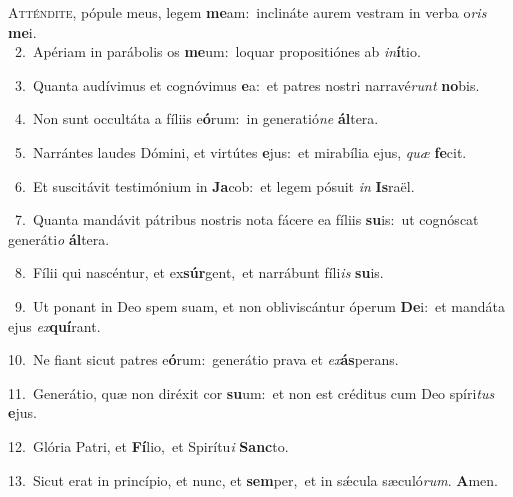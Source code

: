 \lettrine{\initial\textcolor{\initialcolor}{A}}{tténdite,} pópule meus, legem \textbf{me}\-am:~\star inclináte aurem vestram in verba o\textit{ris} \textbf{me}\-i.\\
{\numbfont\textcolor{\numbcolor}{~2.}}~Apériam in parábolis os \textbf{me}\-um:~\star loquar propositiónes ab \textit{in}\-\textbf{í}tio.\par
{\numbfont\textcolor{\numbcolor}{~3.}}~Quanta audívimus et cognóvimus \textbf{e}\-a:~\star et patres nostri narravé\textit{runt} \textbf{no}\-bis.\par
{\numbfont\textcolor{\numbcolor}{~4.}}~Non sunt occultáta a fíliis e\-\textbf{ó}\-rum:~\star in generatió\textit{ne} \textbf{ál}\-tera.\par
{\numbfont\textcolor{\numbcolor}{~5.}}~Narrántes laudes Dómini, et virtútes \textbf{e}\-jus:~\star et mirabília ejus, \textit{quæ} \textbf{fe}\-cit.\par
{\numbfont\textcolor{\numbcolor}{~6.}}~Et suscitávit testimónium in \textbf{Ja}\-cob:~\star et legem pósuit \textit{in} \textbf{Is}\-raël.\par
{\numbfont\textcolor{\numbcolor}{~7.}}~Quanta mandávit pátribus nostris nota fácere ea fíliis \textbf{su}\-is:~\star ut cognóscat generáti\textit{o} \textbf{ál}\-tera.\par
{\numbfont\textcolor{\numbcolor}{~8.}}~Fílii qui nascéntur, et ex\-\textbf{súr}\-gent,~\star et narrábunt fíli\textit{is} \textbf{su}\-is.\par
{\numbfont\textcolor{\numbcolor}{~9.}}~Ut ponant in Deo spem suam, et non obliviscántur óperum \textbf{De}\-i:~\star et mandáta ejus \textit{ex}\-\textbf{quí}rant.\par
{\numbfont\textcolor{\numbcolor}{10.}}~Ne fiant sicut patres e\-\textbf{ó}\-rum:~\star generátio prava et \textit{ex}\-\textbf{ás}perans.\par
{\numbfont\textcolor{\numbcolor}{11.}}~Generátio, quæ non diréxit cor \textbf{su}\-um:~\star et non est créditus cum Deo spíri\textit{tus} \textbf{e}\-jus.\par
{\numbfont\textcolor{\numbcolor}{12.}}~Glória Patri, et \textbf{Fí}\-lio,~\star et Spirítu\textit{i} \textbf{Sanc}\-to.\par
{\numbfont\textcolor{\numbcolor}{13.}}~Sicut erat in princípio, et nunc, et \textbf{sem}\-per,~\star et in sǽcula sæculó\-\textit{rum}\-. \textbf{A}\-men.\par
